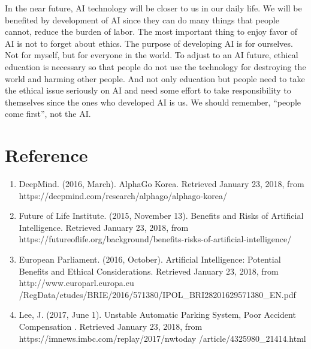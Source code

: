 \documentclass[12pt]{article}
\begin{document}
    In the near future, AI technology will be closer to us in our daily life. We will be benefited by development of AI since they can do many things that people cannot, reduce the burden of labor. The most important thing to enjoy favor of AI is not to forget about ethics. The purpose of developing AI is for ourselves. Not for myself, but for everyone in the world. To adjust to an AI future, ethical education is necessary so that people do not use the technology for destroying the world and harming other people. And not only education but people need to take the ethical issue seriously on AI and need some effort to take responsibility to themselves since the ones who developed AI is us. We should remember, \enquote{people come first}, not the AI. 
\newpage
\hrulefill
\section{Reference}
\begin{enumerate}

\item DeepMind. (2016, March). AlphaGo Korea. Retrieved January 23, 2018, from https://deepmind.com/research/alphago/alphago-korea/

\item Future of Life Institute. (2015, November 13). Benefits and Risks of Artificial Intelligence. Retrieved January 23, 2018, from https://futureoflife.org/background/benefits-risks-of-artificial-intelligence/

\item European Parliament. (2016, October). Artificial Intelligence: Potential Benefits and Ethical Considerations. Retrieved January 23, 2018, from http://www.europarl.europa.eu /RegData/etudes/BRIE/2016/571380/IPOL_BRI28201629571380_EN.pdf

\item Lee, J. (2017, June 1). Unstable Automatic Parking System, Poor Accident Compensation . Retrieved January 23, 2018, from https://imnews.imbc.com/replay/2017/nwtoday /article/4325980_21414.html

\end{enumerate}
\newpage
\end{document}
